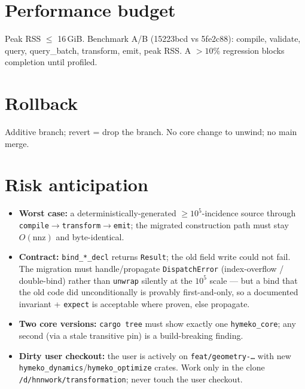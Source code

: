 \documentclass[11pt]{article}
\begin{document}
\section{Performance budget}
Peak RSS $\le$ 16\,GiB. Benchmark A/B (15223bcd vs 5fe2c88): compile, validate, query, query\_batch,
transform, emit, peak RSS. A $>10\%$ regression blocks completion until profiled.

\section{Rollback}
Additive branch; revert = drop the branch. No core change to unwind; no main merge.

\section{Risk anticipation}
\begin{itemize}
  \item \textbf{Worst case:} a deterministically-generated $\ge 10^5$-incidence source through
        \texttt{compile}$\to$\texttt{transform}$\to$\texttt{emit}; the migrated construction path
        must stay $O(\text{nnz})$ and byte-identical.
  \item \textbf{Contract:} \texttt{bind\_*\_decl} returns \texttt{Result}; the old field write could
        not fail. The migration must handle/propagate \texttt{DispatchError} (index-overflow /
        double-bind) rather than \texttt{unwrap} silently at the $10^5$ scale — but a bind that the
        old code did unconditionally is provably first-and-only, so a documented invariant +
        \texttt{expect} is acceptable where proven, else propagate.
  \item \textbf{Two core versions:} \texttt{cargo tree} must show exactly one \texttt{hymeko\_core};
        any second (via a stale transitive pin) is a build-breaking finding.
  \item \textbf{Dirty user checkout:} the user is actively on \texttt{feat/geometry-\dots} with new
        \texttt{hymeko\_dynamics}/\texttt{hymeko\_optimize} crates. Work only in the clone
        \texttt{/d/hnnwork/transformation}; never touch the user checkout.
\end{itemize}
\end{document}
